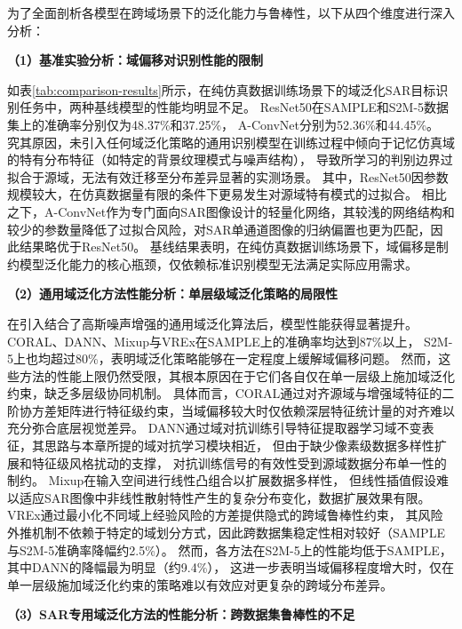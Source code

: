 为了全面剖析各模型在跨域场景下的泛化能力与鲁棒性，以下从四个维度进行深入分析：

\textbf{（1）基准实验分析：域偏移对识别性能的限制}

如表\ref{tab:comparison-results}所示，在纯仿真数据训练场景下的域泛化SAR目标识别任务中，两种基线模型的性能均明显不足。
ResNet50在SAMPLE和S2M-5数据集上的准确率分别仅为48.37\%和37.25\%，
A-ConvNet分别为52.36\%和44.45\%。
究其原因，未引入任何域泛化策略的通用识别模型在训练过程中倾向于记忆仿真域的特有分布特征（如特定的背景纹理模式与噪声结构），
导致所学习的判别边界过拟合于源域，无法有效迁移至分布差异显著的实测场景。
其中，ResNet50因参数规模较大，在仿真数据量有限的条件下更易发生对源域特有模式的过拟合。
相比之下，A-ConvNet作为专门面向SAR图像设计的轻量化网络，其较浅的网络结构和较少的参数量降低了过拟合风险，对SAR单通道图像的归纳偏置也更为匹配，因此结果略优于ResNet50。
基线结果表明，在纯仿真数据训练场景下，域偏移是制约模型泛化能力的核心瓶颈，仅依赖标准识别模型无法满足实际应用需求。

\textbf{（2）通用域泛化方法性能分析：单层级域泛化策略的局限性}

在引入结合了高斯噪声增强的通用域泛化算法后，模型性能获得显著提升。CORAL、DANN、Mixup与VREx在SAMPLE上的准确率均达到87\%以上，
S2M-5上也均超过80\%，表明域泛化策略能够在一定程度上缓解域偏移问题。
然而，这些方法的性能上限仍然受限，其根本原因在于它们各自仅在单一层级上施加域泛化约束，缺乏多层级协同机制。
具体而言，CORAL通过对齐源域与增强域特征的二阶协方差矩阵进行特征级约束，当域偏移较大时仅依赖深层特征统计量的对齐难以充分弥合底层视觉差异。
DANN通过域对抗训练引导特征提取器学习域不变表征，其思路与本章所提的域对抗学习模块相近，
但由于缺少像素级数据多样性扩展和特征级风格扰动的支撑，
对抗训练信号的有效性受到源域数据分布单一性的制约。
Mixup在输入空间进行线性凸组合以扩展数据多样性，
但线性插值假设难以适应SAR图像中非线性散射特性产生的复杂分布变化，数据扩展效果有限。
VREx通过最小化不同域上经验风险的方差提供隐式的跨域鲁棒性约束，
其风险外推机制不依赖于特定的域划分方式，因此跨数据集稳定性相对较好（SAMPLE与S2M-5准确率降幅约2.5\%）。
然而，各方法在S2M-5上的性能均低于SAMPLE，其中DANN的降幅最为明显（约9.4\%），
这进一步表明当域偏移程度增大时，仅在单一层级施加域泛化约束的策略难以有效应对更复杂的跨域分布差异。

\textbf{（3）SAR专用域泛化方法的性能分析：跨数据集鲁棒性的不足}


